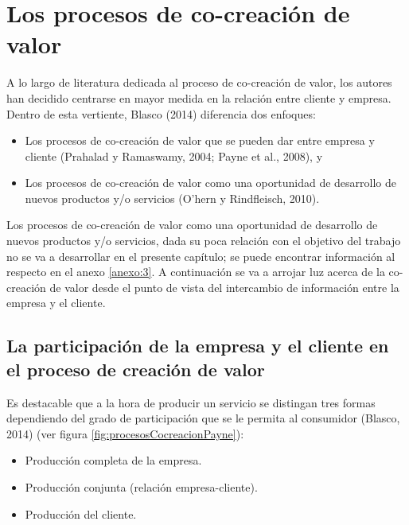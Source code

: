 \section{Los procesos de co-creación de valor}
\label{section:procesosCocreacion}

A lo largo de literatura dedicada al proceso de co-creación de valor, los autores han decidido centrarse en mayor medida en la relación entre cliente y empresa. Dentro de esta vertiente, Blasco (2014) diferencia dos enfoques: 

\begin{itemize}
	\item Los procesos de co-creación de valor que se pueden dar entre empresa y cliente (Prahalad y Ramaswamy, 2004; Payne et al., 2008), y 
	\item Los procesos de co-creación de valor como una oportunidad de desarrollo de nuevos productos y/o servicios (O’hern y Rindfleisch, 2010). 

\end{itemize}

Los procesos de co-creación de valor como una oportunidad de desarrollo de nuevos productos y/o servicios, dada su poca relación con el objetivo del trabajo no se va a desarrollar en el presente capítulo; se puede encontrar información al respecto en el anexo \ref{anexo:3}. 
A continuación se va a arrojar luz acerca de la co-creación de valor desde el punto de vista del intercambio de información entre la empresa y el cliente. 

\subsection{La participación de la empresa y el cliente en el proceso de creación de valor}

Es destacable que a la hora de producir un servicio se distingan tres formas dependiendo del grado de participación que se le permita al consumidor (Blasco, 2014) (ver figura \ref{fig:procesosCocreacionPayne}):

\begin{itemize} 
	\item Producción completa de la empresa. 
	\item Producción conjunta (relación empresa-cliente). 
	\item Producción del cliente. 
\end{itemize}



